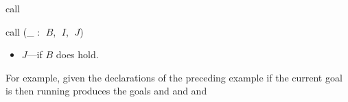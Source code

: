 \begin{tactic}{call}
\begin{tsyntax}{call (_ : $\;B$, $\;I$, $\;J$)}
\begin{itemize}
    \item $J$---if $B$ does hold.
    \end{itemize}

    \medskip
    For example, given the declarations of the preceding example
    if the current goal is
    then running
    produces the goals
     and
     and
     and
  \end{tsyntax}
\end{tactic}
